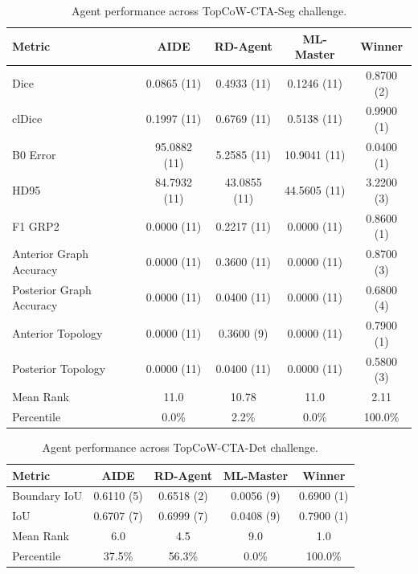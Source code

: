 \begin{table}[htbp]
\centering
\small
\caption{Agent performance across TopCoW-CTA-Seg challenge.}
\vspace{3pt} \label{tab:topcow-track1-task1}
\begin{tabular}{lcccc}
\toprule
\textbf{Metric} & \textbf{AIDE} & \textbf{RD-Agent} & \textbf{ML-Master} & \textbf{Winner} \\
\midrule
Dice & 0.0865 (11) & 0.4933 (11) & 0.1246 (11) & 0.8700 (2) \\
clDice & 0.1997 (11) & 0.6769 (11) & 0.5138 (11) & 0.9900 (1) \\
B0 Error & 95.0882 (11) & 5.2585 (11) & 10.9041 (11) & 0.0400 (1) \\
HD95 & 84.7932 (11) & 43.0855 (11) & 44.5605 (11) & 3.2200 (3) \\
F1 GRP2 & 0.0000 (11) & 0.2217 (11) & 0.0000 (11) & 0.8600 (1) \\
Anterior Graph Accuracy & 0.0000 (11) & 0.3600 (11) & 0.0000 (11) & 0.8700 (3) \\
Posterior Graph Accuracy & 0.0000 (11) & 0.0400 (11) & 0.0000 (11) & 0.6800 (4) \\
Anterior Topology & 0.0000 (11) & 0.3600 (9) & 0.0000 (11) & 0.7900 (1) \\
Posterior Topology & 0.0000 (11) & 0.0400 (11) & 0.0000 (11) & 0.5800 (3) \\
\midrule
Mean Rank & 11.0 & 10.78 & 11.0 & 2.11 \\
Percentile & 0.0\% & 2.2\% & 0.0\% & 100.0\% \\
\bottomrule
\end{tabular}
\end{table}

\begin{table}[htbp]
\centering
\small
\caption{Agent performance across TopCoW-CTA-Det challenge.}
\vspace{3pt} \label{tab:topcow-track1-task2}
\begin{tabular}{lcccc}
\toprule
\textbf{Metric} & \textbf{AIDE} & \textbf{RD-Agent} & \textbf{ML-Master} & \textbf{Winner} \\
\midrule
Boundary IoU & 0.6110 (5) & 0.6518 (2) & 0.0056 (9) & 0.6900 (1) \\
IoU & 0.6707 (7) & 0.6999 (7) & 0.0408 (9) & 0.7900 (1) \\
\midrule
Mean Rank & 6.0 & 4.5 & 9.0 & 1.0 \\
Percentile & 37.5\% & 56.3\% & 0.0\% & 100.0\% \\
\bottomrule
\end{tabular}
\end{table}

